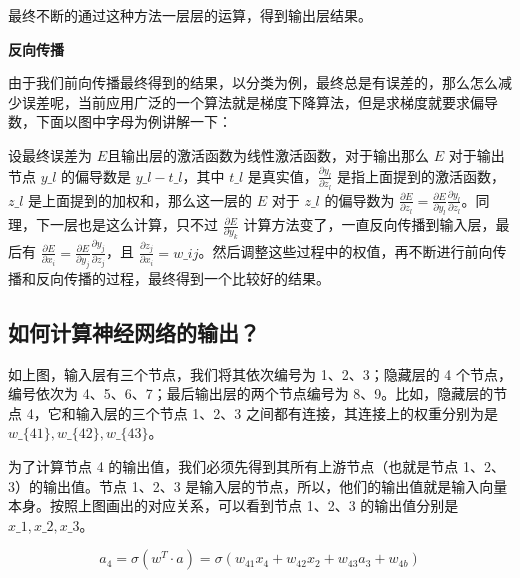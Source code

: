 最终不断的通过这种方法一层层的运算，得到输出层结果。

\textbf{反向传播}

 

由于我们前向传播最终得到的结果，以分类为例，最终总是有误差的，那么怎么减少误差呢，当前应用广泛的一个算法就是梯度下降算法，但是求梯度就要求偏导数，下面以图中字母为例讲解一下：

设最终误差为 $ E $且输出层的激活函数为线性激活函数，对于输出那么 $ E
$ 对于输出节点 $ y\_l $ 的偏导数是 $ y\_l - t\_l $，其中 $ t\_l $
是真实值，$ \frac{\partial y_l}{\partial z_l} $
是指上面提到的激活函数，$ z\_l $ 是上面提到的加权和，那么这一层的 $ E
$ 对于 $ z\_l $ 的偏导数为 $ \frac{\partial E}{\partial z_l} =
\frac{\partial E}{\partial y_l} \frac{\partial y_l}{\partial z_l}
$。同理，下一层也是这么计算，只不过 $ \frac{\partial E}{\partial y_k}
$ 计算方法变了，一直反向传播到输入层，最后有 $
\frac{\partial E}{\partial x_i} = \frac{\partial E}{\partial y_j}
\frac{\partial y_j}{\partial z_j} $，且 $
\frac{\partial z_j}{\partial x_i} = w\_i j
$。然后调整这些过程中的权值，再不断进行前向传播和反向传播的过程，最终得到一个比较好的结果。

\subsection{如何计算神经网络的输出？}\label{ux5982ux4f55ux8ba1ux7b97ux795eux7ecfux7f51ux7edcux7684ux8f93ux51fa}

 

如上图，输入层有三个节点，我们将其依次编号为 1、2、3；隐藏层的 4
个节点，编号依次为 4、5、6、7；最后输出层的两个节点编号为
8、9。比如，隐藏层的节点 4，它和输入层的三个节点 1、2、3
之间都有连接，其连接上的权重分别为是 $ w\_\{41\}, w\_\{42\}, w\_\{43\}
$。

为了计算节点 4 的输出值，我们必须先得到其所有上游节点（也就是节点
1、2、3）的输出值。节点 1、2、3
是输入层的节点，所以，他们的输出值就是输入向量本身。按照上图画出的对应关系，可以看到节点
1、2、3 的输出值分别是 $ x\_1, x\_2, x\_3 $。

\[
a_4 = \sigma(w^T \cdot a) = \sigma(w_{41}x_4 + w_{42}x_2 + w_{43}a_3 + w_{4b})
\]

